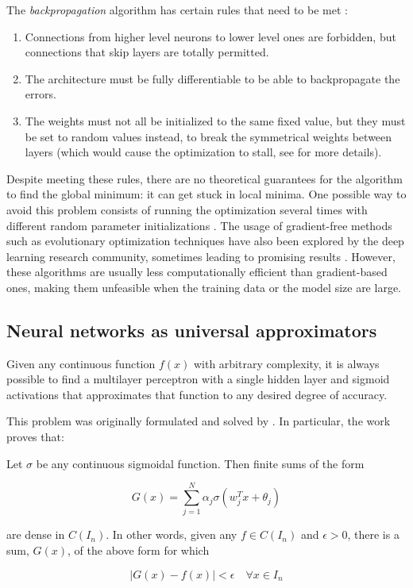 The \textit{backpropagation} algorithm has certain rules that need to be met \autocite{hinton1986}: 

\begin{enumerate}
	\item Connections from higher level neurons to lower level ones are forbidden, but connections that skip layers are totally permitted.
	\item The architecture must be fully differentiable to be able to backpropagate the errors. 
	\item The weights must not all be initialized to the same fixed value, but they must be set to random values instead, to break the symmetrical weights between layers (which would cause the optimization to stall, see \autocite{hinton1986} for more details). 
\end{enumerate}


Despite meeting these rules, there are no theoretical guarantees for the algorithm to find the global minimum: it can get stuck in local minima. One possible way to avoid this problem consists of running the optimization several times with different random parameter initializations \autocite{haykin1998}. The usage of gradient-free methods such as evolutionary optimization techniques \autocite{sivanandam2008} have also been explored by the deep learning research community, sometimes leading to promising results \autocite{omid2014, vallesperez2012}. However, these algorithms are usually less computationally efficient than gradient-based ones, making them unfeasible when the training data or the model size are large.

\subsection{Neural networks as universal approximators}
Given any continuous function $f(x)$ with arbitrary complexity, it is always possible to find a multilayer perceptron with a single hidden layer and sigmoid activations that approximates that function to any desired degree of accuracy.

This problem was originally formulated and solved by \citealp{Cybenko1989}. In particular, the work proves that:

\begin{thm}[2 - Cybenko, 1989]
	Let $\sigma$ be any continuous sigmoidal function. Then finite sums of the form

	$$ G(x) = \sum_{j=1}^{N} \alpha_j \sigma(w_j^Tx + \theta_j) $$

	are dense in $C(I_n)$. In other words, given any $f \in C(I_n)$ and $\epsilon > 0$, there is a sum, $G(x)$, of the above form for which

	$$|G(x) - f(x)| < \epsilon \quad \forall x \in I_n$$
\end{thm}

